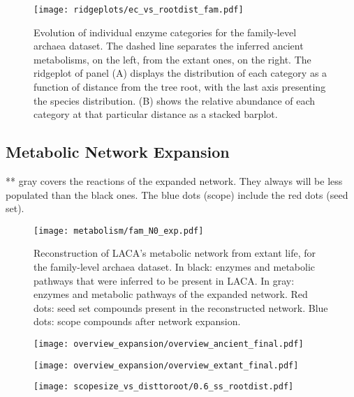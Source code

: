 \begin{figure}[H]
    \centering
    \texttt{[image: ridgeplots/ec\_vs\_rootdist\_fam.pdf]}
    \caption{Evolution of individual enzyme categories for the family-level archaea dataset. The dashed line separates the inferred ancient metabolisms, on the left, from the extant ones, on the right. The ridgeplot of panel (A) displays the distribution of each category as a function of distance from the tree root, with the last axis presenting the species distribution. (B) shows the relative abundance of each category at that particular distance as a stacked barplot.}
    \label{ec_vs_rootdist_fam}
\end{figure}  

\subsection*{Metabolic Network Expansion}

** gray covers the reactions of the expanded network. They always will be less populated than the black ones. The blue dots (scope) include the red dots (seed set).

\begin{figure}[H]
    \centering
    \texttt{[image: metabolism/fam\_N0\_exp.pdf]}
    \caption{Reconstruction of LACA's metabolic network from extant life, for the family-level archaea dataset. In black: enzymes and metabolic pathways that were inferred to be present in LACA. In gray: enzymes and metabolic pathways of the expanded network. Red dots: seed set compounds present in the reconstructed network. Blue dots: scope compounds after network expansion.}    
    \label{fam4arc_metnetexp}
\end{figure}

\begin{figure}[H]
    \centering
    \texttt{[image: overview\_expansion/overview\_ancient\_final.pdf]}
    \caption{}
    \label{overview_ancient}
\end{figure}   


\begin{figure}[H]
    \centering
    \texttt{[image: overview\_expansion/overview\_extant\_final.pdf]}
    \caption{}
    \label{overview_extant}
\end{figure}   

\begin{figure}[H]
    \centering
    \texttt{[image: scopesize\_vs\_disttoroot/0.6\_ss\_rootdist.pdf]}
    \caption{}
    \label{0.6_scopesize}
\end{figure}   

